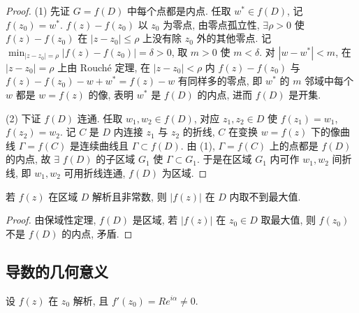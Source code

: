 \documentclass[theorem=false,mathfont=none,openany,sub3section]{easybook}
\begin{document}
\begin{proof}
  (1) 先证 $G=f(D)$ 中每个点都是内点. 任取 $w^{*}\in f(D)$, 记 $f(z_{0})=w^{*}$.
  $f(z)-f(z_{0})$ 以 $z_{0}$ 为零点, 由零点孤立性, $\exists\rho>0$ 使 $f(z)-f(z_{0})$ 在 $|z-z_{0}|\leq\rho$ 上没有除 $z_{0}$ 外的其他零点.
  记 $\displaystyle\min_{|z-z_{0}|=\rho}|f(z)-f(z_{0})|=\delta>0$, 取 $m>0$ 使 $m<\delta$. 对 $|w-w^{*}|<m$, 在 $|z-z_{0}|=\rho$ 上由 Rouch\'{e} 定理,
  在 $|z-z_{0}|<\rho$ 内 $f(z)-f(z_{0})$ 与 $f(z)-f(z_{0})-w+w^{*}=f(z)-w$ 有同样多的零点,
  即 $w^{*}$ 的 $m$ 邻域中每个 $w$ 都是 $w=f(z)$ 的像, 表明 $w^{*}$ 是 $f(D)$ 的内点, 进而 $f(D)$ 是开集.

  (2) 下证 $f(D)$ 连通. 任取 $w_{1},w_{2}\in f(D)$, 对应 $z_{1},z_{2}\in D$ 使 $f(z_{1})=w_{1}$, $f(z_{2})=w_{2}$.
  记 $C$ 是 $D$ 内连接 $z_{1}$ 与 $z_{2}$ 的折线, $C$ 在变换 $w=f(z)$ 下的像曲线 $\Gamma=f(C)$ 是连续曲线且 $\Gamma\subset f(D)$.
  由 (1), $\Gamma=f(C)$ 上的点都是 $f(D)$ 的内点, 故 $\exists$ $f(D)$ 的子区域 $G_{1}$ 使 $\Gamma\subset G_{1}$.
  于是在区域 $G_{1}$ 内可作 $w_{1},w_{2}$ 间折线, 即 $w_{1},w_{2}$ 可用折线连通, $f(D)$ 为区域.
\end{proof}

\begin{corollary}[最大模原理]
  若 $f(z)$ 在区域 $D$ 解析且非常数, 则 $|f(z)|$ 在 $D$ 内取不到最大值.
\end{corollary}

\begin{proof}
  由保域性定理, $f(D)$ 是区域, 若 $|f(z)|$ 在 $z_{0}\in D$ 取最大值, 则 $f(z_{0})$ 不是 $f(D)$ 的内点, 矛盾.
\end{proof}

\subsection{导数的几何意义}

设 $f(z)$ 在 $z_{0}$ 解析, 且 $f'(z_{0})=Re^{i\alpha}\neq0$.
\end{document}
